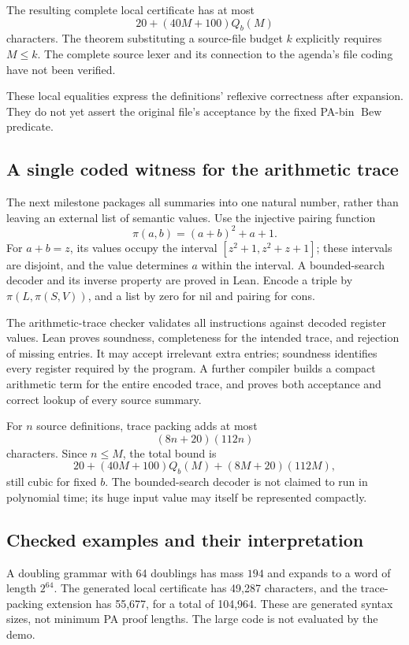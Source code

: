 \documentclass[11pt]{article}
\theoremstyle{definition}
\theoremstyle{remark}
\begin{document}
The resulting complete local certificate has at most
\begin{equation}\label{eq:local-bound}
 20+(40M+100)Q_b(M)
\end{equation}
characters. The theorem substituting a source-file budget $k$ explicitly
requires $M\le k$. The complete source lexer and its connection to the
agenda's file coding have not been verified.

These local equalities express the definitions' reflexive correctness after
expansion. They do not yet assert the original file's acceptance by the fixed
PA-bin $\operatorname{Bew}$ predicate.

\subsection{A single coded witness for the arithmetic trace}
The next milestone packages all summaries into one natural number, rather
than leaving an external list of semantic values. Use the injective pairing
function
\[
 \pi(a,b)=(a+b)^2+a+1.
\]
For $a+b=z$, its values occupy the interval
$[z^2+1,z^2+z+1]$; these intervals are disjoint, and the value determines $a$
within the interval. A bounded-search decoder and its inverse property are
proved in Lean. Encode a triple by $\pi(L,\pi(S,V))$, and a list by zero for
nil and pairing for cons.

The arithmetic-trace checker validates all instructions against decoded
register values. Lean proves soundness, completeness for the intended trace,
and rejection of missing entries. It may accept irrelevant extra entries;
soundness identifies every register required by the program. A further
compiler builds a compact arithmetic term for the entire encoded trace, and
proves both acceptance and correct lookup of every source summary.

For $n$ source definitions, trace packing adds at most
\begin{equation}\label{eq:trace-bound}
 (8n+20)(112n)
\end{equation}
characters. Since $n\le M$, the total bound is
\begin{equation}\label{eq:bundle-bound}
 20+(40M+100)Q_b(M)+(8M+20)(112M),
\end{equation}
still cubic for fixed $b$. The bounded-search decoder is not claimed to run
in polynomial time; its huge input value may itself be represented compactly.

\subsection{Checked examples and their interpretation}
A doubling grammar with 64 doublings has mass $194$ and expands to a word of
length $2^{64}$. The generated local certificate has 49,287 characters, and
the trace-packing extension has 55,677, for a total of 104,964. These are
generated syntax sizes, not minimum PA proof lengths. The large code is not
evaluated by the demo.
\end{document}
